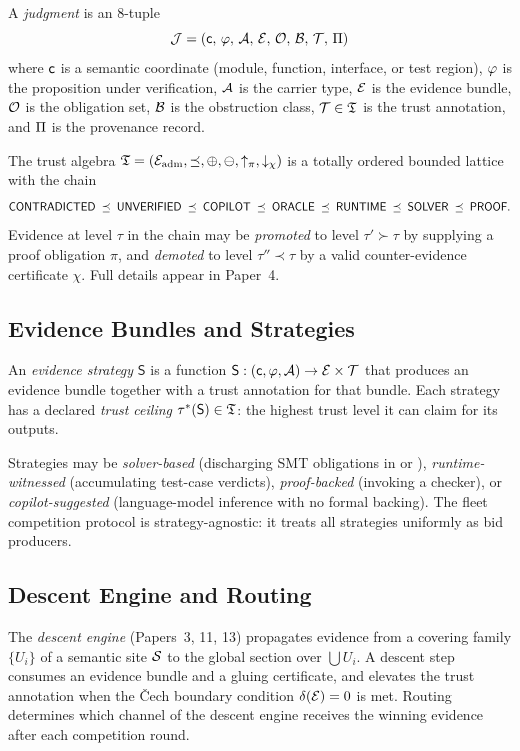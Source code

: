 \documentclass[11pt]{article}
\providecommand{\Strat}{\mathsf{S}}               %
\begin{document}
A \JuGeo{} \emph{judgment} is an 8-tuple
\[
  \mathcal{J} = (\mathsf{c},\,\varphi,\,\mathcal{A},\,\mathcal{E},\,\mathcal{O},\,\mathcal{B},\,\mathcal{T},\,\Pi)
\]
where $\mathsf{c}$ is a semantic coordinate (module, function, interface, or test
region), $\varphi$ is the proposition under verification, $\mathcal{A}$ is the
carrier type, $\mathcal{E}$ is the evidence bundle, $\mathcal{O}$ is the obligation set,
$\mathcal{B}$ is the obstruction class, $\mathcal{T} \in \mathfrak{T}$ is the trust annotation,
and $\Pi$ is the provenance record.

The trust algebra $\mathfrak{T} = (\mathcal{E}_{\mathrm{adm}}, \preceq, \oplus, \ominus, \uparrow_\pi,
\downarrow_\chi)$ is a totally ordered bounded lattice with the chain
\[
  \mathsf{CONTRADICTED} \;\preceq\; \mathsf{UNVERIFIED} \;\preceq\; \mathsf{COPILOT} \;\preceq\; \mathsf{ORACLE}
  \;\preceq\; \mathsf{RUNTIME} \;\preceq\; \mathsf{SOLVER} \;\preceq\; \mathsf{PROOF}.
\]
Evidence at level $\tau$ in the chain may be \emph{promoted} to level
$\tau' \succ \tau$ by supplying a proof obligation $\pi$, and \emph{demoted}
to level $\tau'' \prec \tau$ by a valid counter-evidence certificate $\chi$.
Full details appear in Paper~4.

\subsection{Evidence Bundles and Strategies}

An \emph{evidence strategy} $\Strat$ is a function
$\Strat : (\coord, \prop, \carrier) \to \evid \times \trust$ that produces
an evidence bundle together with a trust annotation for that bundle.  Each
strategy has a declared \emph{trust ceiling} $\tau^*(\Strat) \in \Talg$:
the highest trust level it can claim for its outputs.

Strategies may be \emph{solver-based} (discharging SMT obligations in
\QFLIA{} or \QFLRA{}), \emph{runtime-witnessed} (accumulating test-case
verdicts), \emph{proof-backed} (invoking a \LEAN{} checker), or
\emph{copilot-suggested} (language-model inference with no formal backing).
The fleet competition protocol is strategy-agnostic: it treats all strategies
uniformly as bid producers.

\subsection{Descent Engine and Routing}

The \emph{descent engine} (Papers~3, 11, 13) propagates evidence from a
covering family $\{U_i\}$ of a semantic site $\mathcal{S}$ to the global section
over $\bigcup U_i$.  A descent step consumes an evidence bundle and a gluing
certificate, and elevates the trust annotation when the Čech boundary
condition $\delta(\mathcal{E}) = 0$ is met.  Routing determines which channel of
the descent engine receives the winning evidence after each competition round.
\end{document}
